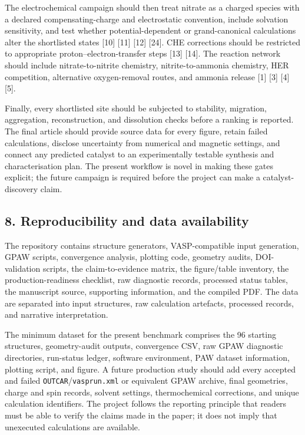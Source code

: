 \documentclass[
]{article}
\begin{document}
The electrochemical campaign should then treat nitrate as a charged
species with a declared compensating-charge and electrostatic
convention, include solvation sensitivity, and test whether
potential-dependent or grand-canonical calculations alter the
shortlisted states {[}10{]} {[}11{]} {[}12{]} {[}24{]}. CHE corrections
should be restricted to appropriate proton--electron-transfer steps
{[}13{]} {[}14{]}. The reaction network should include
nitrate-to-nitrite chemistry, nitrite-to-ammonia chemistry, HER
competition, alternative oxygen-removal routes, and ammonia release
{[}1{]} {[}3{]} {[}4{]} {[}5{]}.

Finally, every shortlisted site should be subjected to stability,
migration, aggregation, reconstruction, and dissolution checks before a
ranking is reported. The final article should provide source data for
every figure, retain failed calculations, disclose uncertainty from
numerical and magnetic settings, and connect any predicted catalyst to
an experimentally testable synthesis and characterisation plan. The
present workflow is novel in making these gates explicit; the future
campaign is required before the project can make a catalyst-discovery
claim.

\hypertarget{reproducibility-and-data-availability}{%
\subsection{8. Reproducibility and data
availability}\label{reproducibility-and-data-availability}}

The repository contains structure generators, VASP-compatible input
generation, GPAW scripts, convergence analysis, plotting code, geometry
audits, DOI-validation scripts, the claim-to-evidence matrix, the
figure/table inventory, the production-readiness checklist, raw
diagnostic records, processed status tables, the manuscript source,
supporting information, and the compiled PDF. The data are separated
into input structures, raw calculation artefacts, processed records, and
narrative interpretation.

The minimum dataset for the present benchmark comprises the 96 starting
structures, geometry-audit outputs, convergence CSV, raw GPAW diagnostic
directories, run-status ledger, software environment, PAW dataset
information, plotting script, and figure. A future production study
should add every accepted and failed
\texttt{OUTCAR}/\texttt{vasprun.xml} or equivalent GPAW archive, final
geometries, charge and spin records, solvent settings, thermochemical
corrections, and unique calculation identifiers. The project follows the
reporting principle that readers must be able to verify the claims made
in the paper; it does not imply that unexecuted calculations are
available.
\end{document}
